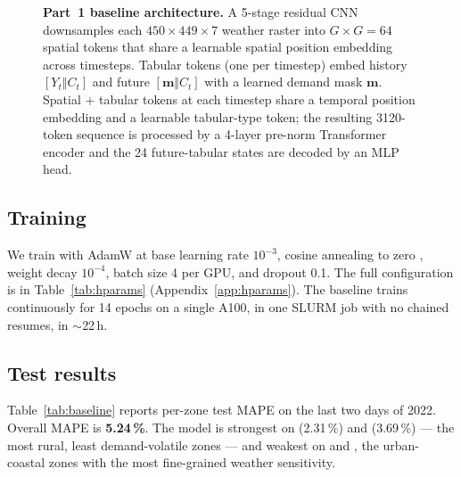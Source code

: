 \documentclass[11pt,letterpaper]{article}
\begin{document}
\begin{figure}[!h]
\caption{\textbf{Part~1 baseline architecture.} A 5-stage residual CNN downsamples each $450{\times}449{\times}7$ weather raster into $G{\times}G{=}64$ spatial tokens that share a learnable spatial position embedding across timesteps. Tabular tokens (one per timestep) embed history $[Y_t \Vert C_t]$ and future $[\mathbf{m}\Vert C_t]$ with a learned demand mask $\mathbf{m}$. Spatial + tabular tokens at each timestep share a temporal position embedding and a learnable tabular-type token; the resulting 3120-token sequence is processed by a 4-layer pre-norm Transformer encoder and the 24 future-tabular states are decoded by an MLP head.}
\label{fig:arch}
\end{figure}

\subsection{Training}

We train with AdamW \citep{loshchilov2019adamw} at base learning rate $10^{-3}$, cosine annealing to zero \citep{loshchilov2017sgdr}, weight decay $10^{-4}$, batch size 4 per GPU, and dropout 0.1. The full configuration is in Table~\ref{tab:hparams} (Appendix~\ref{app:hparams}). The baseline trains continuously for 14 epochs on a single A100, in one SLURM job with no chained resumes, in $\sim$22\,h.

\subsection{Test results}

Table~\ref{tab:baseline} reports per-zone test MAPE on the last two days of 2022. Overall MAPE is \textbf{5.24\,\%}. The model is strongest on  (2.31\,\%) and  (3.69\,\%) --- the most rural, least demand-volatile zones --- and weakest on  and , the urban-coastal zones with the most fine-grained weather sensitivity.
\end{document}
